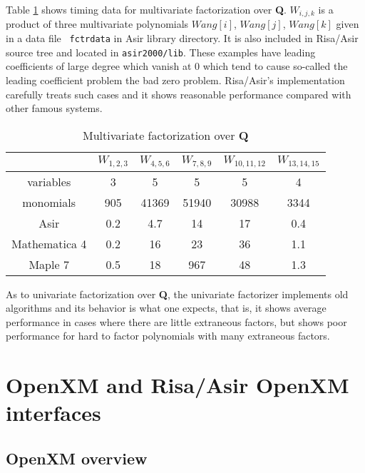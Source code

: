 \documentclass[runningheads]{cl2emult}
\begin{document}
Table \ref{multifac} shows timing data for multivariate factorization
over {\bf Q}.  $W_{i,j,k}$ is a product of three multivariate
polynomials $Wang[i]$, $Wang[j]$, $Wang[k]$ given in a data file {\tt
fctrdata} in Asir library directory. It is also included in Risa/Asir
source tree and located in {\tt asir2000/lib}.  These examples have
leading coefficients of large degree which vanish at 0 which tend to
cause so-called the leading coefficient problem the bad zero
problem. Risa/Asir's implementation carefully treats such cases and it
shows reasonable performance compared with other famous systems.
\begin{table}[hbtp]
\begin{center}
\begin{tabular}{|c||c|c|c|c|c|} \hline
	& $W_{1,2,3}$ & $W_{4,5,6}$ & $W_{7,8,9}$ & $W_{10,11,12}$ & $W_{13,14,15}$ \\ \hline
variables & 3 & 5 & 5 & 5 & 4 \\ \hline
monomials & 905 & 41369 & 51940 & 30988 & 3344 \\ \hline\hline
Asir 	& 0.2 & 4.7 & 14 & 17 & 0.4 \\ \hline
Mathematica 4& 0.2 	& 16 	& 23 & 36 & 1.1 \\ \hline
Maple 7& 0.5 	& 18 	& 967  & 48 & 1.3 \\ \hline
\end{tabular}
\end{center}
\caption{Multivariate factorization over {\bf Q}}
\label{multifac}
\end{table}
As to univariate factorization over {\bf Q}, the univariate factorizer
implements old algorithms and its behavior is what one expects,
that is, it shows average performance in cases where there are little
extraneous factors, but shows poor performance for hard to factor
polynomials with many extraneous factors.

\section{OpenXM and Risa/Asir OpenXM interfaces}

\subsection{OpenXM overview}
\end{document}
